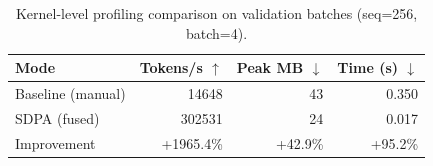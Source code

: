 
\begin{table}[ht]
  \centering
  \caption{Kernel-level profiling comparison on validation batches (seq=256, batch=4).}
  \label{tab:kernel_profile}
  \begin{tabular}{lrrr}
    \toprule
    Mode & Tokens/s $\uparrow$ & Peak MB $\downarrow$ & Time (s) $\downarrow$ \\
    \midrule
    Baseline (manual) & 14648 & 43 & 0.350 \\
    SDPA (fused)      & 302531 & 24 & 0.017 \\
    \midrule
    Improvement       & +1965.4\% & +42.9\% & +95.2\% \\
    \bottomrule
  \end{tabular}
\end{table}
